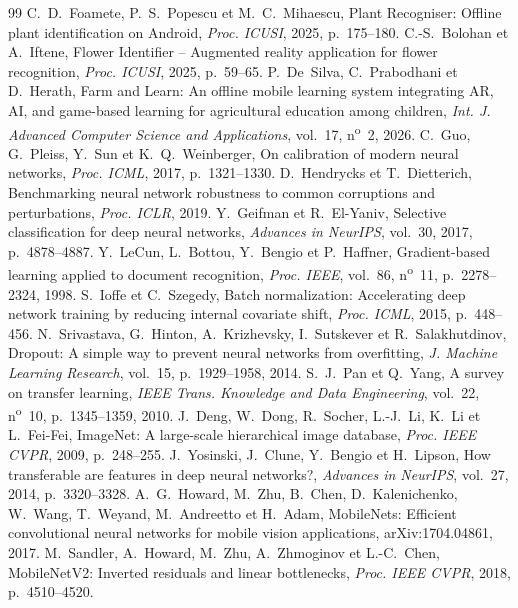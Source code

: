 \documentclass[conference]{IEEEtran}
\begin{document}
\begin{thebibliography}{99}
 C.~D.~Foamete, P.~S.~Popescu et M.~C.~Mihaescu, \og Plant Recogniser: Offline plant identification on Android\fg{}, \emph{Proc. ICUSI}, 2025, p.~175--180.
 C.-S.~Bolohan et A.~Iftene, \og Flower Identifier -- Augmented reality application for flower recognition\fg{}, \emph{Proc. ICUSI}, 2025, p.~59--65.
 P.~De~Silva, C.~Prabodhani et D.~Herath, \og Farm and Learn: An offline mobile learning system integrating AR, AI, and game-based learning for agricultural education among children\fg{}, \emph{Int. J. Advanced Computer Science and Applications}, vol.~17, n\textsuperscript{o}~2, 2026.
 C.~Guo, G.~Pleiss, Y.~Sun et K.~Q.~Weinberger, \og On calibration of modern neural networks\fg{}, \emph{Proc. ICML}, 2017, p.~1321--1330.
 D.~Hendrycks et T.~Dietterich, \og Benchmarking neural network robustness to common corruptions and perturbations\fg{}, \emph{Proc. ICLR}, 2019.
 Y.~Geifman et R.~El-Yaniv, \og Selective classification for deep neural networks\fg{}, \emph{Advances in NeurIPS}, vol.~30, 2017, p.~4878--4887.
 Y.~LeCun, L.~Bottou, Y.~Bengio et P.~Haffner, \og Gradient-based learning applied to document recognition\fg{}, \emph{Proc. IEEE}, vol.~86, n\textsuperscript{o}~11, p.~2278--2324, 1998.
 S.~Ioffe et C.~Szegedy, \og Batch normalization: Accelerating deep network training by reducing internal covariate shift\fg{}, \emph{Proc. ICML}, 2015, p.~448--456.
 N.~Srivastava, G.~Hinton, A.~Krizhevsky, I.~Sutskever et R.~Salakhutdinov, \og Dropout: A simple way to prevent neural networks from overfitting\fg{}, \emph{J. Machine Learning Research}, vol.~15, p.~1929--1958, 2014.
 S.~J.~Pan et Q.~Yang, \og A survey on transfer learning\fg{}, \emph{IEEE Trans. Knowledge and Data Engineering}, vol.~22, n\textsuperscript{o}~10, p.~1345--1359, 2010.
 J.~Deng, W.~Dong, R.~Socher, L.-J.~Li, K.~Li et L.~Fei-Fei, \og ImageNet: A large-scale hierarchical image database\fg{}, \emph{Proc. IEEE CVPR}, 2009, p.~248--255.
 J.~Yosinski, J.~Clune, Y.~Bengio et H.~Lipson, \og How transferable are features in deep neural networks?\fg{}, \emph{Advances in NeurIPS}, vol.~27, 2014, p.~3320--3328.
 A.~G.~Howard, M.~Zhu, B.~Chen, D.~Kalenichenko, W.~Wang, T.~Weyand, M.~Andreetto et H.~Adam, \og MobileNets: Efficient convolutional neural networks for mobile vision applications\fg{}, arXiv:1704.04861, 2017.
 M.~Sandler, A.~Howard, M.~Zhu, A.~Zhmoginov et L.-C.~Chen, \og MobileNetV2: Inverted residuals and linear bottlenecks\fg{}, \emph{Proc. IEEE CVPR}, 2018, p.~4510--4520.

\end{thebibliography}
\end{document}
